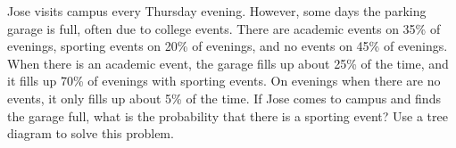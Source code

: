 \begin{exercisewrap}
\begin{nexercise} \label{exerciseForParkingLotOnCampusBeingFullAndWhetherOrNotThereIsASportingEvent}
Jose visits campus every Thursday evening. However, some days the parking garage is full, often due to college events. There are academic events on 35\% of evenings, sporting events on 20\% of evenings, and no events on 45\% of evenings. When there is an academic event, the garage fills up about 25\% of the time, and it fills up 70\% of evenings with sporting events. On evenings when there are no events, it only fills up about 5\% of the time. If Jose comes to campus and finds the garage full, what is the probability that there is a sporting event? Use a tree diagram to solve this problem.\footnotemark
\end{nexercise}
\end{exercisewrap}

